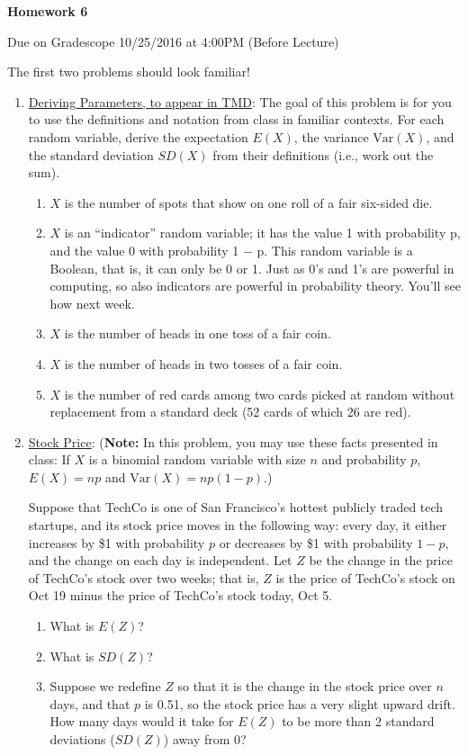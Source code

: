\documentclass[11pt]{article}
\newcommand{\V}{\mathrm{Var}}
\begin{document}
\centerline{\textbf{Homework 6}}
\centerline{Due on Gradescope 10/25/2016 at 4:00PM (Before Lecture)}

The first two problems should look familiar!

\begin{enumerate}
\item \underline{Deriving Parameters, to appear in TMD}:
The goal of this problem is for you to use the definitions and notation from class in familiar
contexts. For each random variable, derive the expectation $E(X)$, the variance $\V(X)$, and the standard deviation $SD(X)$ from their definitions (i.e., work out the sum). 
\begin{enumerate}
\item $X$ is the number of spots that show on one roll of a fair six-sided die.
\item $X$ is an ``indicator'' random variable; it has the value 1 with probability p, and the value 0
with probability 1 − p. This random variable is a Boolean, that is, it can only be 0 or 1. Just as
0’s and 1’s are powerful in computing, so also indicators are powerful in probability theory. You’ll see how next week.
\item $X$ is the number of heads in one toss of a fair coin.
\item $X$ is the number of heads in two tosses of a fair coin.
\item $X$ is the number of red cards among two cards picked at random without replacement from
a standard deck (52 cards of which 26 are red).
\end{enumerate}

\item \underline{Stock Price}:
    ({\bf Note:} In this problem, you may use these facts presented in class: If $X$ is a binomial random variable with size $n$ and probability $p$, $E(X) = np$ and $\V(X) = np(1-p)$.)

Suppose that TechCo is one of San Francisco's hottest publicly traded tech startups, and its stock price moves in the following way: every day, it either increases by \$1 with probability $p$ or decreases by \$1 with probability $1-p$, and the change on each day is independent. Let $Z$ be the change in the price of TechCo's stock over two weeks; that is, $Z$ is the price of TechCo's stock on Oct 19 minus the price of TechCo's stock today, Oct 5.

\begin{enumerate}
    \item What is $E(Z)$?
    \item What is $SD(Z)$?
    \item Suppose we redefine $Z$ so that it is the change in the stock price over $n$ days, and that $p$ is 0.51, so the stock price has a very slight upward drift. How many days would it take for $E(Z)$ to be more than 2 standard deviations ($SD(Z)$) away from 0?
\end{enumerate}


\end{enumerate}
\end{document}
